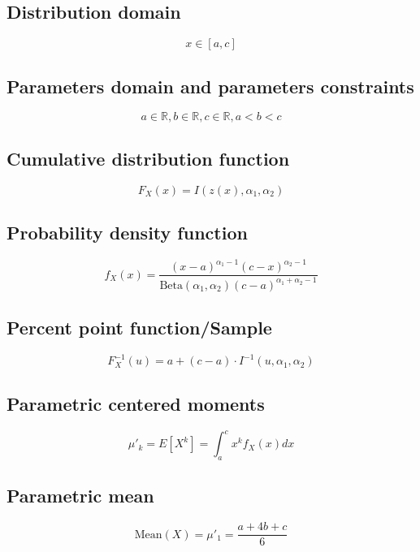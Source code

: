 \documentclass{article}
\begin{document}
\subsection{Distribution domain}
\begin{equation*} x\in\left[a,c\right] \end{equation*}
\subsection{Parameters domain and parameters constraints}
\begin{equation*} a\in\mathbb{R}, b\in\mathbb{R}, c\in\mathbb{R}, a < b < c \end{equation*}
\subsection{Cumulative distribution function}
\begin{equation*} F_{X}\left(x\right)=I(z(x),\alpha_{1},\alpha_{2}) \end{equation*}
\subsection{Probability density function}
\begin{equation*} f_{X}\left(x\right)=\frac{(x-a)^{\alpha_{1}-1}(c-x)^{\alpha_{2}-1}} {\text{Beta}(\alpha_{1},\alpha_{2})(c-a)^{\alpha_{1}+\alpha_{2}-1}} \end{equation*}
\subsection{Percent point function/Sample}
\begin{equation*} F^{-1}_{X}\left(u\right)=a+(c-a)\cdot I^{-1}\left(u,\alpha_{1},\alpha_{2}\right) \end{equation*}
\subsection{Parametric centered moments}
\begin{equation*} \mu'_{k}=E[X^k]=\int_{a}^{c}x^{k}f_{X}\left(x\right)dx \end{equation*}
\subsection{Parametric mean}
\begin{equation*} \mathrm{Mean}(X)=\mu'_{1}=\frac{a+4b+c}{6} \end{equation*}
\end{document}
